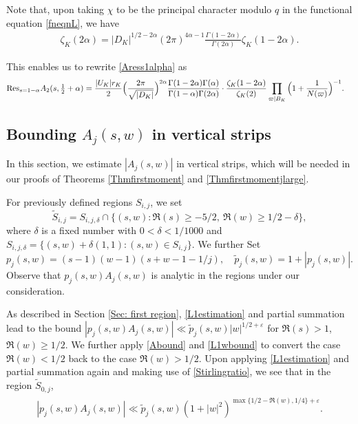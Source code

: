 \documentclass[twoside,leqno,10pt, A4]{amsart}
\begin{document}
 Note that, upon taking $\chi$ to be the principal character modulo $q$ in the functional equation \eqref{fneqnL}, we have
\begin{align*}
  \zeta_K(2\alpha)=|D_K|^{1/2-2\alpha}(2\pi)^{4\alpha-1}\frac {\Gamma(1-2\alpha)}{\Gamma (2\alpha)}\zeta_K(1-2\alpha).
\end{align*}

   This enables us to rewrite \eqref{Aress1alpha} as
\begin{align}
\label{Aress1}
\begin{split}
		&\mathrm{Res}_{s=1-\alpha}A_2(s,\tfrac{1}{2}+\alpha) =\frac {|U_K|r_K}{2} \Big(\frac {2\pi}{\sqrt{|D_K|}}\Big )^{2\alpha} \frac{\Gamma
(1-2\alpha)\Gamma ( \alpha)}{\Gamma(1-\alpha)\Gamma (2\alpha)}\cdot\frac{\zeta_K(1-2\alpha)}{\zeta_K(2)}\prod_{\varpi | B_K}\Big(1+\frac
1{N(\varpi)}\Big )^{-1}.
\end{split}
\end{align}

\subsection{Bounding $A_j(s,w)$ in vertical strips}
\label{Section bound in vertical strips}
	
  In this section, we estimate $|A_j(s,w)|$ in vertical strips, which will be needed in our proofs of Theorems \ref{Thmfirstmoment} and \ref{Thmfirstmomentjlarge}. \newline
	
  For previously defined regions $S_{i,j}$, we set
\begin{equation*}
		\widetilde S_{i,j}=S_{i, j,\delta}\cap\{(s,w):\Re(s) \geq -5/2,\ \Re(w) \geq 1/2-\delta\},
\end{equation*}
	where $\delta$ is a fixed number with $0<\delta <1/1000$ and $S_{i, j,\delta}= \{ (s,w)+\delta (1,1) : (s,w) \in S_{i,j} \} $. We further
Set
\begin{equation*}
		p_j(s,w)=(s-1)(w-1)(s+w-1-1/j), \quad \widetilde p_j(s,w)=1+|p_j(s,w)|.
\end{equation*}
Observe that $p_j(s,w)A_j(s,w)$ is analytic in the regions under our consideration. \newline

 As described in Section \ref{Sec: first region}, \eqref{L1estimation} and partial summation lead to the bound $|p_j(s,w)A_j(s,w)| \ll \widetilde p_j(s,w)|w|^{1/2+\varepsilon}$ for $\Re(s)>1$, $\Re(w) \geq 1/2$.  We further apply \eqref{Abound} and \eqref{L1wbound} to convert the case $\Re(w) <1/2$ back to the case $\Re(w) >1/2$. Upon applying \eqref{L1estimation} and partial summation again and making use of \eqref{Stirlingratio}, we see that in the region
$\widetilde S_{0,j}$,
\begin{align*}
\begin{split}
      |p_j(s,w)A_j(s,w)| \ll \widetilde p_j(s,w)(1+|w|^2)^{\max \{1/2-\Re(w), 1/4 \}+\varepsilon}.
\end{split}
\end{align*}
\end{document}
